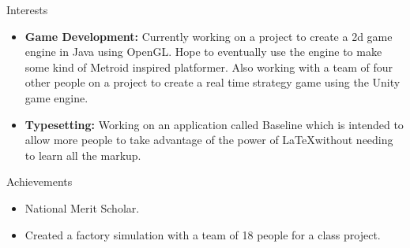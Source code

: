 \documentclass[10pt,oneside]{article}
\newenvironment{ressection}[1]{
	\vspace{4pt}
	{\fontfamily{phv}\selectfont\Large#1}
	\begin{itemize}
	\vspace{3pt}
}{
	\end{itemize}
}
\newcommand{\resitem}[1]{
	\vspace{-4pt}
	\item \begin{flushleft} #1 \end{flushleft}
}
\begin{document}


\begin{ressection}{Interests}
	\resitem{\textbf{Game Development:}  Currently working on a project to create a 2d game engine in Java using OpenGL.  Hope to eventually use the engine to make some kind of Metroid inspired platformer.  Also working with a team of four other people on a project to create a real time strategy game using the Unity game engine.}
	\resitem{\textbf{Typesetting:} Working on an application called Baseline which is intended to allow more people to take advantage of the power of \LaTeX without needing to learn all the markup.} 
\end{ressection}


\begin{ressection}{Achievements}


	\resitem{National Merit Scholar.}
	
	\resitem{Created a factory simulation with a team of 18 people for a class project.}
	

\end{ressection}
\end{document}
